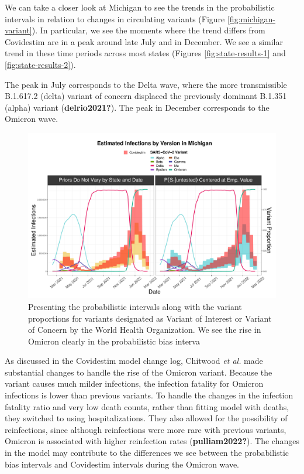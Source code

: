 \documentclass[12pt,twoside]{smiththesis}
\begin{document}
We can take a closer look at Michigan to see the trends in the probabilistic intervals in relation to changes in circulating variants (Figure \ref{fig:michigan-variant}). In particular, we see the moments where the trend differs from Covidestim are in a peak around late July and in December. We see a similar trend in these time periods across most states (Figures \ref{fig:state-results-1} and \ref{fig:state-results-2}).

The peak in July corresponds to the Delta wave, where the more transmissible B.1.617.2 (delta) variant of concern displaced the previously dominant B.1.351 (alpha) variant (\textbf{delrio2021?}). The peak in December corresponds to the Omicron wave.
\begin{figure}
\includegraphics[width=1\linewidth]{figure/michigan_variant} \caption{\label{fig:michigan-variant}Presenting the probabilistic intervals along with the variant proportions for variants designated as Variant of Interest or Variant of Concern by the World Health Organization. We see the rise in Omicron clearly in the probabilistic bias interva}\label{fig:unnamed-chunk-7}
\end{figure}
As discussed in the Covidestim model change log, Chitwood \emph{et al.} made substantial changes to handle the rise of the Omicron variant. Because the variant causes much milder infections, the infection fatality for Omicron infections is lower than previous variants. To handle the changes in the infection fatality ratio and very low death counts, rather than fitting model with deaths, they switched to using hospitalizations. They also allowed for the possibility of reinfections, since although reinfections were more rare with previous variants, Omicron is associated with higher reinfection rates (\textbf{pulliam2022?}). The changes in the model may contribute to the differences we see between the probabilistic bias intervals and Covidestim intervals during the Omicron wave.
\end{document}
